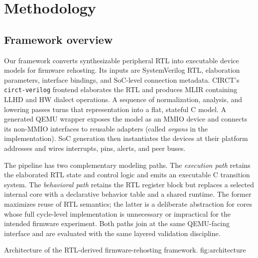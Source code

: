 
\section{Methodology}\label{sec:methodology}

\subsection{Framework overview}\label{sec:framework-overview}

Our framework converts synthesizable peripheral RTL into executable device
models for firmware rehosting.  Its inputs are SystemVerilog RTL, elaboration
parameters, interface bindings, and SoC-level connection metadata.  CIRCT's
\texttt{circt-verilog} frontend elaborates the RTL and produces MLIR containing
LLHD and HW dialect operations.  A sequence of normalization, analysis, and
lowering passes turns that representation into a flat, stateful C model.  A
generated QEMU wrapper exposes the model as an MMIO device and connects its
non-MMIO interfaces to reusable adapters (called \emph{organs} in the
implementation).  SoC generation then instantiates the devices at their
platform addresses and wires interrupts, pins, alerts, and peer buses.

The pipeline has two complementary modeling paths.  The \emph{execution path}
retains the elaborated RTL state and control logic and emits an executable C
transition system.  The \emph{behavioral path} retains the RTL register block
but replaces a selected internal core with a declarative behavior table and a
shared runtime.  The former maximizes reuse of RTL semantics; the latter is a
deliberate abstraction for cores whose full cycle-level implementation is
unnecessary or impractical for the intended firmware experiment.  Both paths
join at the same QEMU-facing interface and are evaluated with the same layered
validation discipline.

{Architecture of the RTL-derived firmware-rehosting framework.}
{fig:architecture}

